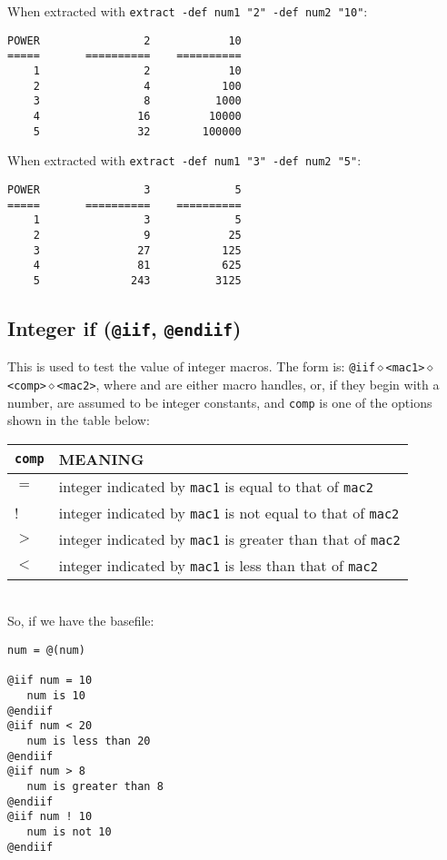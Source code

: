 \noindent
When extracted with {\tt extract -def num1 "2" -def num2 "10"}:
\begin{verbatim}
POWER                2            10
=====       ==========    ==========
    1                2            10
    2                4           100
    3                8          1000
    4               16         10000
    5               32        100000
\end{verbatim}

\noindent
When extracted with {\tt extract -def num1 "3" -def num2 "5"}:
\begin{verbatim}
POWER                3             5
=====       ==========    ==========
    1                3             5
    2                9            25
    3               27           125
    4               81           625
    5              243          3125
\end{verbatim}

\subsection{Integer if ({\tt @iif}, {\tt @endiif})}
This is used to test the value of integer macros.  The form is:
{\tt @iif$\diamond$<mac1>$\diamond$<comp>$\diamond$<mac2>}, where
{\tt <mac1>} and {\tt <mac2>} are either macro handles, or, if they
begin with a number, are assumed to be integer constants,
and {\tt comp} is one of the options shown in the table below:\\
\begin{tabular}{|l|l|}\hline
{\tt comp} & MEANING\\\hline
$=$   & integer indicated by {\tt mac1} is equal to that of {\tt mac2}\\\hline
!     & integer indicated by {\tt mac1} is not equal to that of {\tt mac2}\\\hline
$>$ & integer indicated by {\tt mac1} is greater than that of {\tt mac2}\\\hline
$<$ & integer indicated by {\tt mac1} is less than that of {\tt mac2}\\\hline
\end{tabular} \\

So, if we have the basefile:
\begin{verbatim}
num = @(num)

@iif num = 10
   num is 10
@endiif
@iif num < 20
   num is less than 20
@endiif
@iif num > 8
   num is greater than 8
@endiif
@iif num ! 10
   num is not 10
@endiif
\end{verbatim}

